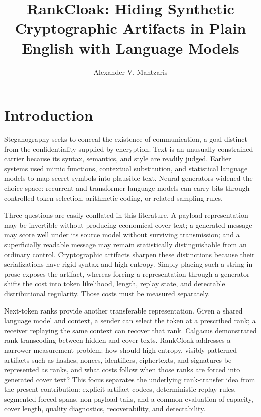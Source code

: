\documentclass[fleqn,10pt]{wlscirep}
\title{RankCloak: Hiding Synthetic Cryptographic Artifacts in Plain English with Language Models}
\author[1,*]{Alexander V. Mantzaris}
\affil[1]{School of Data, Mathematical, and Statistical Sciences, University of Central Florida, Orlando, FL, United States of America}
\affil[*]{Correspondence: alexander.mantzaris@ucf.edu}
\begin{document}
\maketitle
\linenumbers
\raggedbottom

\section*{Introduction}\label{sec:introduction}

Steganography seeks to conceal the existence of communication, a goal distinct from the confidentiality supplied by encryption\cite{Simmons1984Prisoners,Cachin1998InformationTheoretic,Hopper2002ProvablySecureSteganography,Petitcolas1999InformationHidingSurvey}. Text is an unusually constrained carrier because its syntax, semantics, and style are readily judged. Earlier systems used mimic functions, contextual substitution, and statistical language models to map secret symbols into plausible text\cite{Wayner1992MimicFunctions,ChangClark2014PracticalLinguisticSteganography}. Neural generators widened the choice space: recurrent and transformer language models can carry bits through controlled token selection, arithmetic coding, or related sampling rules\cite{Fang2017GeneratingSteganographicTextLSTMs,Yang2019RNNStega,Ziegler2019NeuralLinguisticSteganography,DaiCai2019NearImperceptible,Shen2020SelfAdjustingArithmetic,Zhang2021ProvablySecureGenerative,Wang2025DAIRStega,Wu2024GenerativeTextSteganographyLLM,Lin2024ZeroShotGLS}.

Three questions are easily conflated in this literature. A payload representation may be invertible without producing economical cover text; a generated message may score well under its source model without surviving transmission; and a superficially readable message may remain statistically distinguishable from an ordinary control. Cryptographic artifacts sharpen these distinctions because their serializations have rigid syntax and high entropy. Simply placing such a string in prose exposes the artifact, whereas forcing a representation through a generator shifts the cost into token likelihood, length, replay state, and detectable distributional regularity. Those costs must be measured separately.

Next-token ranks provide another transferable representation. Given a shared language model and context, a sender can select the token at a prescribed rank; a receiver replaying the same context can recover that rank. Calgacus demonstrated rank transcoding between hidden and cover texts\cite{NorelliBronstein2026Calgacus}. RankCloak addresses a narrower measurement problem: how should high-entropy, visibly patterned artifacts such as hashes, nonces, identifiers, ciphertexts, and signatures be represented as ranks, and what costs follow when those ranks are forced into generated cover text? This focus separates the underlying rank-transfer idea from the present contribution: explicit artifact codecs, deterministic replay rules, segmented forced spans, non-payload tails, and a common evaluation of capacity, cover length, quality diagnostics, recoverability, and detectability.
\end{document}
